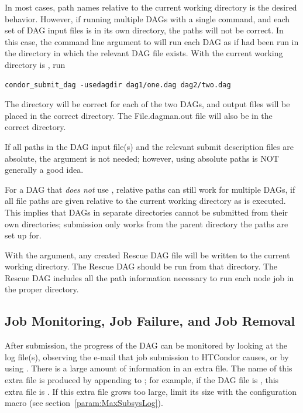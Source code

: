 In most cases, path names relative to the current working directory 
is the desired behavior.
However, if running
multiple DAGs with a single  command, 
and each set of DAG input files is in its own directory, 
the paths will not be correct. 
In this case,
the  command line argument to 
will run each DAG as if  had been run 
in the directory in which the relevant DAG file exists.
With the current working directory
is , run 
\begin{verbatim}
condor_submit_dag -usedagdir dag1/one.dag dag2/two.dag
\end{verbatim}
The directory will be correct for each of the two DAGs,
and output files will be placed in the correct directory.
The File{.dagman.out} file will also be in the correct directory.

If all paths in the DAG input file(s) and the relevant submit
description files are absolute,
the  argument is not needed;
however, using absolute paths is NOT generally a good idea.

For a DAG that \emph{does not} use , 
relative paths can still work for multiple DAGs, 
if all file paths are given relative to
the current working directory as  is executed.
This implies that DAGs in separate directories
cannot be submitted from their own directories;
submission only works from the parent directory the paths are set up for.

With the  argument, any created 
Rescue DAG file will be written to
the current working directory.
The Rescue DAG should be run from that directory.
The Rescue DAG includes all the path information necessary to
run each node job in the proper directory.

\subsection{Job Monitoring, Job Failure, and Job Removal}

After submission, the progress of the DAG can be monitored
by looking at the log file(s),
observing the e-mail that job submission to HTCondor causes,
or by using  .
There is a large amount of information in an extra file.
The name of this extra file is produced by appending
 to ; for example, if the
DAG file is , this extra file is
.
If this extra file grows too large, limit its size
with the  configuration macro (see
section~\ref{param:MaxSubsysLog}).

